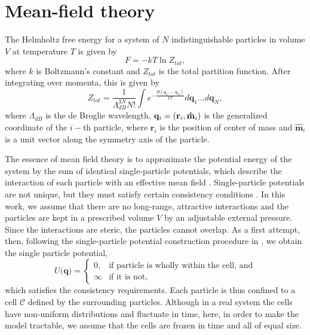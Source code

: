 \documentclass{article}
\begin{document}
\section{Mean-field theory}

\label{Sec_theory}

The Helmholtz free energy for a system of $N$ indistinguishable particles in
volume $V$ at temperature $T$ is given by \cite{Eyring1941} 
\begin{equation}
F=-kT\ln Z_{tot},  \label{eq_energy_1}
\end{equation}%
where $k$ is Boltzmann's constant and $Z_{tot}$ is the total partition
function. After integrating over momenta, this is given by 
\begin{equation}
Z_{tot}=\frac{1}{\Lambda _{dB}^{3N}N!}\int e^{-\frac{H(\mathbf{q}_{1},...,%
\mathbf{q}_{N})}{kT}}d\mathbf{q}_{1}...d\mathbf{q}_{N},  \label{eq_Z_tot}
\end{equation}%
where $\Lambda _{dB}$ is the de Broglie wavelength, $\mathbf{q}_{i}=(\mathbf{%
r}_{i}, \mathbf{\hat{m}}_{i})$ is the generalized coordinate of the $i-$th
particle, where $\mathbf{r}_{i}$ is the position of center of mass and $%
\mathbf{\hat{m}}_{i}$ is a unit vector along the symmetry axis of the
particle.

The essence of mean field theory is to approximate the potential energy of
the system by the sum of identical single-particle potentials, which
describe the interaction of each particle with an effective mean field \cite%
{Kuzemsky}. Single-particle potentials are not unique, but they must satisfy
certain consistency conditions \cite{PPM}. In this work, we assume that
there are no long-range, attractive interactions and the particles are kept
in a prescribed volume $V$ by an adjustable external pressure. Since the
interactions are steric, the particles cannot overlap. As a first attempt,
then, following the single-particle potential construction procedure in \cite%
{PPM}, we obtain the single particle potential,%
\begin{equation}
U(\mathbf{q)=}\left\{ 
\begin{array}{cc}
0, & \text{if particle is wholly within the cell, and} \\ 
\infty & \text{if it is not,}%
\end{array}%
\right.  \label{SP}
\end{equation}%
which satisfies the consistency requirements. Each particle is thus confined
to a cell $\mathcal{C}$ defined by the surrounding particles. Although in a
real system the cells have non-uniform distributions and fluctuate in time,
here, in order to make the model tractable, we assume that the cells are
frozen in time and all of equal size.
\end{document}
